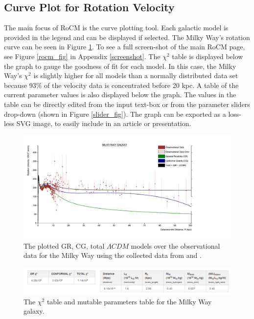 \documentclass[conference]{IEEEtran-modified}
\begin{document}
\subsection{Curve Plot for Rotation Velocity}
The main focus of RoCM is the curve plotting tool. Each galactic model is provided in the legend and can be displayed if selected. The Milky Way's rotation curve can be seen in Figure \ref{milkywayplot}. To see a full screen-shot of the main RoCM page, see Figure \ref{rocm_fig} in Appendix \ref{screenshot}. The $\chi^2$ table is displayed below the graph to gauge the goodness of fit for each model. In this case, the Milky Way's $\chi^2$ is slightly higher for all models than a normally distributed data set because 93\% of the velocity data is concentrated before 20 kpc. A table of the current parameter values is also displayed below the graph. The values in the table can be directly edited from the input text-box or from the parameter sliders drop-down (shown in Figure \ref{slider_fig}). The graph can be exported as a loss-less SVG image, to easily include in an article or presentation.

\begin{figure}[h!]
\centering
\includegraphics[width=\textwidth]{MILKY-WAY}
\caption{The plotted GR, CG, total $\Lambda CDM$ models over the observational data for the Milky Way using the collected data from \cite{kundu} and \cite{sofue}.}
\label{milkywayplot}
\end{figure}



\begin{figure}[h!]
\centering
\includegraphics[width=\textwidth]{MILKY-WAY-CHI-PARAMS}
\caption{The $\chi^2$ table and mutable parameters table for the Milky Way galaxy.}
\label{param_table_fig}
\end{figure}
\end{document}
